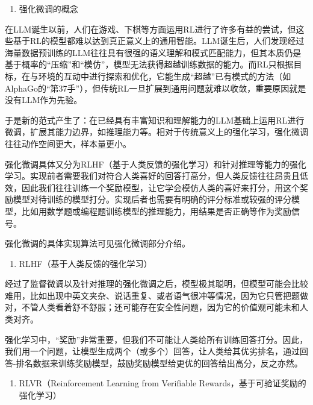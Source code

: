 \begin{enumerate}
\def\labelenumi{\arabic{enumi}.}
\setcounter{enumi}{1}
\tightlist
\item
  强化微调的概念
\end{enumerate}

在LLM诞生以前，人们在游戏、下棋等方面运用RL进行了许多有益的尝试，但这些基于RL的模型都难以达到真正意义上的通用智能。LLM诞生后，人们发现经过海量数据预训练的LLM往往具有很强的语义理解和模式匹配能力，但其本质仍是基于概率的``压缩''和``模仿''，模型无法获得超越训练数据的能力。而RL只根据目标，在与环境的互动中进行探索和优化，它能生成``超越''已有模式的方法（如AlphaGo的``第37手''），但传统RL一旦扩展到通用问题就难以收敛，重要原因就是没有LLM作为先验。

于是新的范式产生了：在已经具有丰富知识和理解能力的LLM基础上运用RL进行微调，扩展其能力边界，如推理能力等。相对于传统意义上的强化学习，强化微调往往动作空间更大，样本量更小。

强化微调具体又分为RLHF（基于人类反馈的强化学习）和针对推理等能力的强化学习。实现前者需要我们对符合人类喜好的回答打高分，但人类反馈往往昂贵且低效，因此我们往往训练一个奖励模型，让它学会模仿人类的喜好来打分，用这个奖励模型对待训练的模型打分。实现后者也需要有明确的评分标准或较强的评分模型，比如用数学题或编程题训练模型的推理能力，用结果是否正确等作为奖励信号。

强化微调的具体实现算法可见强化微调部分介绍。

\begin{enumerate}
\def\labelenumi{\arabic{enumi}.}
\setcounter{enumi}{2}
\tightlist
\item
  RLHF（基于人类反馈的强化学习）
\end{enumerate}

经过了监督微调以及针对推理的强化微调之后，模型极其聪明，但模型可能会比较难用，比如出现中英文夹杂、说话重复、或者语气很冲等情况，因为它只管把题做对，不管人类看着舒不舒服；还可能存在安全性问题，因为它的价值观可能未和人类对齐。

强化学习中，``奖励''非常重要，但我们不可能让人类给所有训练回答打分。因此，我们用一个问题，让模型生成两个（或多个）回答，让人类给其优劣排名，通过回答-排名数据来训练奖励模型，鼓励奖励模型给更优的回答给出高分，反之亦然。

\begin{enumerate}
\def\labelenumi{\arabic{enumi}.}
\setcounter{enumi}{3}
\tightlist
\item
  RLVR（Reinforcement Learning from Verifiable Rewards，基于可验证奖励的强化学习）
\end{enumerate}

